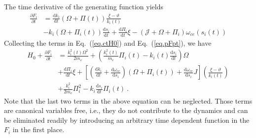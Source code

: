 The time derivative of the generating function yields
\begin{equation}\label{eq.pFpt}
    \begin{aligned}
    \frac{\partial F_i}{\partial t} & = \frac{\mathrm{d} k_i}{\mathrm{d} t}(\Omega + \Pi(t)) \frac{\xi-\vartheta}{k_i(t)} 
    \\
    &- k_i\left(\Omega+\Pi_i(t)\right) \frac{\mathrm{d} s_i}{\mathrm{d} t} + \frac{\mathrm{d} \Pi_i}{\mathrm{d} t} \xi - (\mathcal{J} + \Omega + \Pi_i)\omega_{ce}(s_i(t)) 
    \end{aligned}
\end{equation}
Collecting the terms in Eq.~(\ref{eq.ctH0}) and Eq.~(\ref{eq.pFpt}), we have
\begin{equation}\label{eq.merge}
    \begin{aligned}
    H_0 + \frac{\partial F_i}{\partial t} & = \frac{k_{i}^{2}(t) \Omega^{2}}{2 m_{e}}+\left(\frac{k_{i}^{2}(t)}{m_{e}} \Pi_{i}(t)-k_i(t) \frac{\mathrm{d} s_i}{\mathrm{d} t}\right) \Omega
    \\
    &+\frac{\mathrm{d}\Pi_{i}}{\mathrm{d}t} \xi
     +\left[\left(\frac{\mathrm{d}k_{i}}{\mathrm{d}t}+\frac{\mathrm{d}\omega_{c e}}{\mathrm{d}s_{i}}\right)\left(\Omega+\Pi_{i}(t)\right)+\frac{\mathrm{d}\omega_{c e}}{\mathrm{d}s_{i}} J\right]\left(\frac{\xi-\vartheta}{k_{i}(t)}\right)
     \\
     &+ \frac{k_i^2}{2m_e} \Pi_i^2 - k_i \frac{\mathrm{d} s_i}{\mathrm{d}t}\Pi_i(t) ~.
    \end{aligned}
\end{equation}
Note that the last two terms in the above equation can be neglected.
Those terms are canonical variables free, i.e., they do not contribute to the dynamics and can be eliminated readily by introducing an arbitrary time dependent function in the $F_i$ in the first place. 

